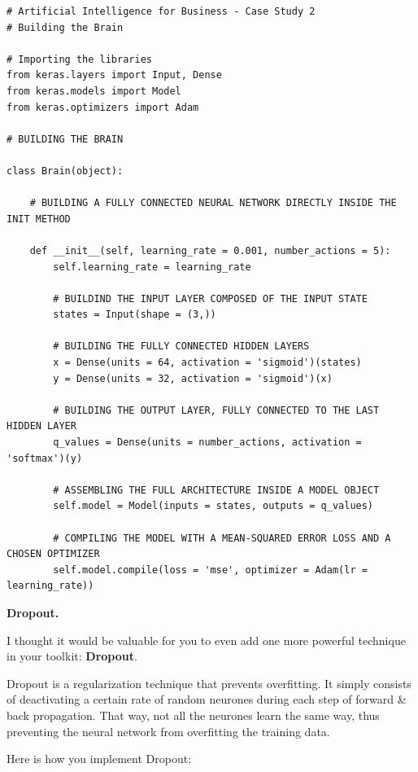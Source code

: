 \documentclass[]{book}
\begin{document}
\begin{lstlisting}
# Artificial Intelligence for Business - Case Study 2
# Building the Brain

# Importing the libraries
from keras.layers import Input, Dense
from keras.models import Model
from keras.optimizers import Adam

# BUILDING THE BRAIN

class Brain(object):
    
    # BUILDING A FULLY CONNECTED NEURAL NETWORK DIRECTLY INSIDE THE INIT METHOD
    
    def __init__(self, learning_rate = 0.001, number_actions = 5):
        self.learning_rate = learning_rate
        
        # BUILDIND THE INPUT LAYER COMPOSED OF THE INPUT STATE
        states = Input(shape = (3,))
        
        # BUILDING THE FULLY CONNECTED HIDDEN LAYERS
        x = Dense(units = 64, activation = 'sigmoid')(states)
        y = Dense(units = 32, activation = 'sigmoid')(x)
        
        # BUILDING THE OUTPUT LAYER, FULLY CONNECTED TO THE LAST HIDDEN LAYER
        q_values = Dense(units = number_actions, activation = 'softmax')(y)
        
        # ASSEMBLING THE FULL ARCHITECTURE INSIDE A MODEL OBJECT
        self.model = Model(inputs = states, outputs = q_values)
        
        # COMPILING THE MODEL WITH A MEAN-SQUARED ERROR LOSS AND A CHOSEN OPTIMIZER
        self.model.compile(loss = 'mse', optimizer = Adam(lr = learning_rate))
\end{lstlisting}

\textbf{Dropout.}

I thought it would be valuable for you to even add one more powerful technique in your toolkit: \textbf{Dropout}.

Dropout is a regularization technique that prevents overfitting. It simply consists of deactivating a certain rate of random neurones during each step of forward \& back propagation. That way, not all the neurones learn the same way, thus preventing the neural network from overfitting the training data.

Here is how you implement Dropout:
\end{document}
